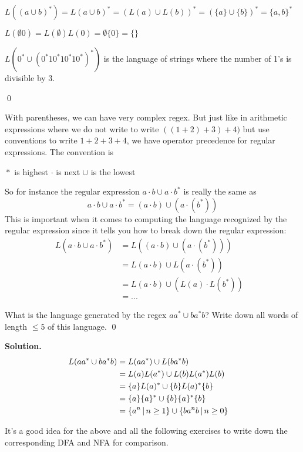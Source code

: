 \begin{eg}
  \mbox{}
  \begin{tightlist}
  \item $L((a \cup b)^*) = L(a \cup b)^* = (L(a) \cup L(b))^* = (\{a\} \cup
    \{b\})^* = \{a,b\}^*$
  \item $L(\emptyset 0) = L(\emptyset) L(0) = \emptyset  \{0\} = \{\}$
  \item $L( 0^* \cup (0^*10^*10^*10^*)^*)$ is the language of strings
    where the number of 1's is divisible by 3.
  \end{tightlist}
  \qed
\end{eg}


With parentheses, we can have very complex regex.
But just like in arithmetic expressions where we do not write to
write $((1 + 2) + 3) + 4)$ but use conventions to write $1 + 2 + 3 + 4$,
we have operator precedence for regular expressions.
The convention is 
\begin{tightlist}
\li ${}*$ is highest
\li $\cdot $ is next
\li $\cup$ is the lowest
\end{tightlist}
So for instance the regular expression $a\cdot b \cup a\cdot b^*$ 
is really the same as
\[
a\cdot b \cup a\cdot b^*
=
(a\cdot b) \cup (a\cdot (b^*))
\]
This is important when it comes to computing the language recognized by 
the regular expression since it tells you how to break down the regular 
expression:
\begin{align*}
L(a\cdot b \cup a\cdot b^*)
&= L((a\cdot b) \cup (a\cdot (b^*))) \\
&= L(a\cdot b) \cup L(a\cdot (b^*)) \\
&= L(a\cdot b) \cup (L(a) \cdot L(b^*)) \\
&= ... &
\end{align*}



\begin{ex}
What is the language generated by the regex $aa^* \cup ba^*b$?
Write down all words of length $\leq 5$ of this language.
\qed
\end{ex}

\textbf{Solution.}
\begin{align*}
 L(aa^* \cup ba^*b)
  &= L(aa^*) \cup L(ba^*b) \cr
  &= L(a)L(a^*) \cup L(b)L(a^*)L(b) \cr
  &= \{a\}L(a)^* \cup \{b\}L(a)^*\{b\} \cr
  &= \{a\}\{a\}^* \cup \{b\}\{a\}^*\{b\} \cr
  &= \{ a^n \,|\, n \geq 1 \} \cup \{ ba^nb \,|\, n \geq 0 \}
 \end{align*}

It's a good idea for the above and all the following exercises to 
write down the corresponding DFA and NFA for comparison.


